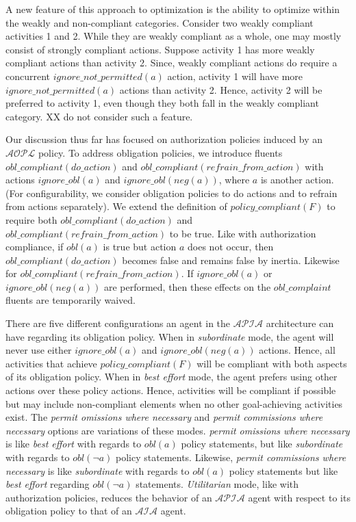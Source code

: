 A new feature of this approach to optimization is the ability to optimize within the weakly and non-compliant categories.
Consider two weakly compliant activities 1 and 2.
While they are weakly compliant as a whole, one may mostly consist of strongly compliant actions.
Suppose activity 1 has more weakly compliant actions than activity 2.
Since, weakly compliant actions do require a concurrent $ignore\_not\_permitted(a)$ action, activity 1 will have more $ignore\_not\_permitted(a)$ actions than activity 2.
Hence, activity 2 will be preferred to activity 1, even though they both fall in the weakly compliant category.
XX do not consider such a feature.

Our discussion thus far has focused on authorization policies induced by an $\mathcal{AOPL}$ policy.
To address obligation policies, we introduce fluents $obl\_compliant(do\_action)$ and $obl\_compliant(refrain\_from\_action)$ with actions $ignore\_obl(a)$ and $ignore\_obl(neg(a))$, where $a$ is another action.
(For configurability, we consider obligation policies to do actions and to refrain from actions separately).
We extend the definition of $policy\_compliant(F)$ to require both $obl\_compliant(do\_action)$ and $obl\_compliant(refrain\_from\_action)$ to be true.
Like with authorization compliance, if $obl(a)$ is true but action $a$ does not occur, then $obl\_compliant(do\_action)$ becomes false and remains false by inertia.
Likewise for $obl\_compliant(refrain\_from\_action)$.
If $ignore\_obl(a)$ or $ignore\_obl(neg(a))$ are performed, then these effects on the $obl\_complaint$ fluents are temporarily waived.

There are five different configurations an agent in the $\mathcal{APIA}$ architecture can have regarding its obligation policy.
When in \textit{subordinate} mode, the agent will never use either $ignore\_obl(a)$ and $ignore\_obl(neg(a))$ actions.
Hence, all activities that achieve $policy\_compliant(F)$ will be compliant with both aspects of its obligation policy.
When in \textit{best effort} mode, the agent prefers using other actions over these policy actions.
Hence, activities will be compliant if possible but may include non-compliant elements when no other goal-achieving activities exist.
The \textit{permit omissions where necessary} and \textit{permit commissions where necessary} options are variations of these modes.
\textit{permit omissions where necessary} is like \textit{best effort} with regards to $obl(a)$ policy statements, but like \textit{subordinate} with regards to $obl(\neg a)$ policy statements.
Likewise, \textit{permit commissions where necessary} is like \textit{subordinate} with regards to $obl(a)$ policy statements but like \textit{best effort} regarding $obl(\neg a)$ statements.
\textit{Utilitarian} mode, like with authorization policies, reduces the behavior of an $\mathcal{APIA}$ agent with respect to its obligation policy to that of an $\mathcal{AIA}$ agent.

